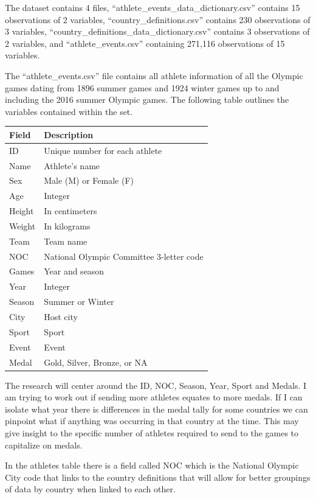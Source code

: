 \documentclass[
]{article}
\begin{document}
The dataset contains 4 files, ``athlete\_events\_data\_dictionary.csv'' contains 15 observations of 2 variables, ``country\_definitions.csv'' contains 230 observations of 3 variables, ``country\_definitions\_data\_dictionary.csv'' contains 3 observations of 2 variables, and ``athlete\_events.csv'' containing 271,116 observations of 15 variables.

The ``athlete\_events.csv'' file contains all athlete information of all the Olympic games dating from 1896 summer games and 1924 winter games up to and including the 2016 summer Olympic games. The following table outlines the variables contained within the set.

\begin{longtable}[t]{ll}
\toprule
Field & Description\\
\midrule
ID & Unique number for each athlete\\
Name & Athlete's name\\
Sex & Male (M) or Female (F)\\
Age & Integer\\
Height & In centimeters\\
\addlinespace
Weight & In kilograms\\
Team & Team name\\
NOC & National Olympic Committee 3-letter code\\
Games & Year and season\\
Year & Integer\\
\addlinespace
Season & Summer or Winter\\
City & Host city\\
Sport & Sport\\
Event & Event\\
Medal & Gold, Silver, Bronze, or NA\\
\bottomrule
\end{longtable}

The research will center around the ID, NOC, Season, Year, Sport and Medals. I am trying to work out if sending more athletes equates to more medals. If I can isolate what year there is differences in the medal tally for some countries we can pinpoint what if anything was occurring in that country at the time. This may give insight to the specific number of athletes required to send to the games to capitalize on medals.

In the athletes table there is a field called NOC which is the National Olympic City code that links to the country definitions that will allow for better groupings of data by country when linked to each other.
\end{document}
